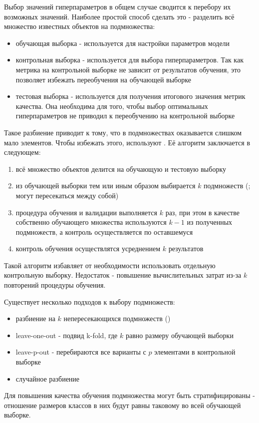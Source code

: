Выбор значений гиперпараметров в общем случае сводится к перебору их возможных значений. Наиболее простой способ сделать это - разделить всё множество известных объектов на подмножества:

\begin{itemize}
\item обучающая выборка - используется для настройки параметров модели
\item контрольная выборка - используется для выбора гиперпараметров. Так как метрика на контрольной выборке не зависит от результатов обучения, это позволяет избежать переобучения на обучающей выборке
\item тестовая выборка - используется для получения итогового значения метрик качества. Она необходима для того, чтобы выбор оптимальных гиперпараметров не приводил к переобучению на контрольной выборке
\end{itemize}

Такое разбиение приводит к тому, что в подмножествах оказывается слишком мало элементов. Чтобы избежать этого, используют . Её алгоритм заключается в следующем:

\begin{enumerate}
\item всё множество объектов делится на обучающую и тестовую выборку
\item из обучающей выборки тем или иным образом выбирается $k$ подмножеств (; могут пересекаться между собой)
\item процедура обучения и валидации выполняется $k$ раз, при этом в качестве собственно обучающего множества используются $k-1$ из полученных подмножеств, а контроль осуществляется по оставшемуся
\item контроль обучения осуществлятся усреднением $k$ результатов
\end{enumerate}

Такой алгоритм избавляет от необходимости использовать отдельную контрольную выборку. Недостаток - повышение вычислительных затрат из-за $k$ повторений процедуры обучения.

Существует несколько подходов к выбору подмножеств:

\begin{itemize}
\item разбиение на $k$ непересекающихся подмножеств ()
\item leave-one-out - подвид k-fold, где $k$ равно размеру обучающей выборки
\item leave-p-out - перебираются все варианты с $p$ элементами в контрольной выборке
\item случайное разбиение
\end{itemize}

Для повышения качества обучения подмножества могут быть стратифицированы - отношение размеров классов в них будут равны таковому во всей обучающей выборке.

